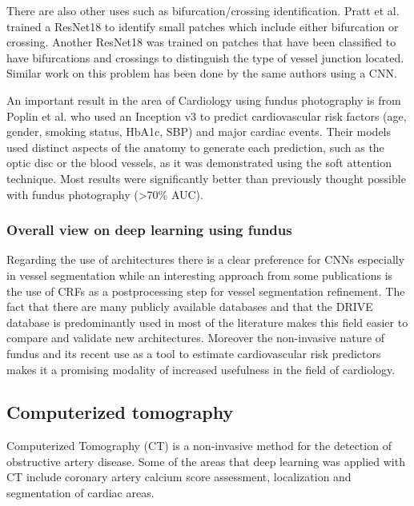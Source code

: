 \documentclass[journal]{IEEEtran}
\begin{document}
There are also other uses such as bifurcation/crossing identification.
Pratt et al.\cite{pratt2017automatica} trained a ResNet18 to identify small patches which include either bifurcation or crossing.
Another ResNet18 was trained on patches that have been classified to have bifurcations and crossings to distinguish the type of vessel junction located.
Similar work on this problem has been done by the same authors\cite{pratt2017automaticb} using a CNN\@.

An important result in the area of Cardiology using fundus photography is from Poplin et al.\cite{poplin2017predicting} who used an Inception v3 to predict cardiovascular risk factors (age, gender, smoking status, HbA1c, SBP) and major cardiac events.
Their models used distinct aspects of the anatomy to generate each prediction, such as the optic disc or the blood vessels, as it was demonstrated using the soft attention technique.
Most results were significantly better than previously thought possible with fundus photography (\textgreater{70\%} AUC).

\subsubsection{Overall view on deep learning using fundus}
Regarding the use of architectures there is a clear preference for CNNs especially in vessel segmentation while an interesting approach from some publications is the use of CRFs as a postprocessing step for vessel segmentation refinement\cite{zhou2017improving, fu2016retinal}.
The fact that there are many publicly available databases and that the DRIVE database is predominantly used in most of the literature makes this field easier to compare and validate new architectures.
Moreover the non-invasive nature of fundus and its recent use as a tool to estimate cardiovascular risk predictors makes it a promising modality of increased usefulness in the field of cardiology.

\subsection{Computerized tomography}
Computerized Tomography (CT) is a non-invasive method for the detection of obstructive artery disease.
Some of the areas that deep learning was applied with CT include coronary artery calcium score assessment, localization and segmentation of cardiac areas.
\end{document}
